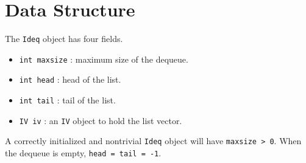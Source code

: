 \par
\section{Data Structure}
\label{section:Ideq:dataStructure}
\par
The {\tt Ideq} object has four fields.
\begin{itemize}
\item 
{\tt int maxsize} : maximum size of the dequeue.
\item 
{\tt int head}    : head of the list.
\item 
{\tt int tail}    : tail of the list.
\item 
{\tt IV iv} : an {\tt IV} object to hold the list vector.
\end{itemize}
A correctly initialized and nontrivial {\tt Ideq} object 
will have {\tt maxsize > 0}.
When the dequeue is empty, {\tt head = tail = -1}.
